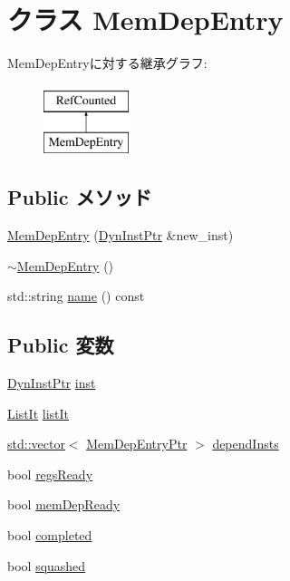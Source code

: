 \hypertarget{classMemDepUnit_1_1MemDepEntry}{
\section{クラス MemDepEntry}
\label{classMemDepUnit_1_1MemDepEntry}
}
MemDepEntryに対する継承グラフ:\begin{figure}[H]
\begin{center}
\leavevmode
\includegraphics[height=2cm]{classMemDepUnit_1_1MemDepEntry}
\end{center}
\end{figure}
\subsection*{Public メソッド}
\begin{DoxyCompactItemize}
\item 
\hyperlink{classMemDepUnit_1_1MemDepEntry_ad9b3189e351f38b82275ea8605f6e3b3}{MemDepEntry} (\hyperlink{classRefCountingPtr}{DynInstPtr} \&new\_\-inst)
\item 
\hyperlink{classMemDepUnit_1_1MemDepEntry_a6b10def69437a251be0b0666daa22114}{$\sim$MemDepEntry} ()
\item 
std::string \hyperlink{classMemDepUnit_1_1MemDepEntry_a37627d5d5bba7f4a8690c71c2ab3cb07}{name} () const 
\end{DoxyCompactItemize}
\subsection*{Public 変数}
\begin{DoxyCompactItemize}
\item 
\hyperlink{classRefCountingPtr}{DynInstPtr} \hyperlink{classMemDepUnit_1_1MemDepEntry_af5d4fb974eeb4507d4c837d365d0cefc}{inst}
\item 
\hyperlink{classMemDepUnit_a184cb829e22cc656acb41864f68f51ea}{ListIt} \hyperlink{classMemDepUnit_1_1MemDepEntry_ac8188604da9551279a59cfbbc6683fdb}{listIt}
\item 
\hyperlink{classstd_1_1vector}{std::vector}$<$ \hyperlink{classRefCountingPtr}{MemDepEntryPtr} $>$ \hyperlink{classMemDepUnit_1_1MemDepEntry_acb5f13b3085f8fd62136e9118aaa8e81}{dependInsts}
\item 
bool \hyperlink{classMemDepUnit_1_1MemDepEntry_afc55485f8d2b3483d6b56df95ffc0156}{regsReady}
\item 
bool \hyperlink{classMemDepUnit_1_1MemDepEntry_a1f5ab91d27c3ebd7a0bdc85c87030126}{memDepReady}
\item 
bool \hyperlink{classMemDepUnit_1_1MemDepEntry_a8c06e370b709d689e392a4b7b53b47c5}{completed}
\item 
bool \hyperlink{classMemDepUnit_1_1MemDepEntry_ab80f932400baee226095b8eb35f92383}{squashed}
\end{DoxyCompactItemize}



